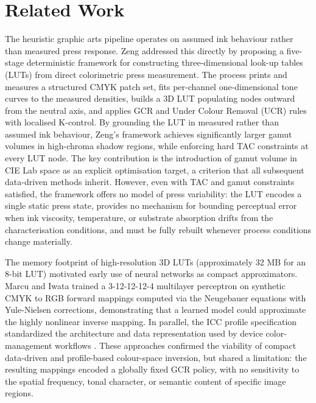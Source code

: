 \documentclass[11pt]{article}
\begin{document}
\section{Related Work}

The heuristic graphic arts pipeline operates on assumed ink behaviour rather than measured press response. Zeng \cite{zeng} addressed this directly by proposing a five-stage deterministic framework for constructing three-dimensional look-up tables (LUTs) from direct colorimetric press measurement. The process prints and measures a structured CMYK patch set, fits per-channel one-dimensional tone curves to the measured densities, builds a 3D LUT populating nodes outward from the neutral axis, and applies GCR and Under Colour Removal (UCR) rules with localised K-control. By grounding the LUT in measured rather than assumed ink behaviour, Zeng's framework achieves significantly larger gamut volumes in high-chroma shadow regions, while enforcing hard TAC constraints at every LUT node. The key contribution is the introduction of gamut volume in CIE Lab space as an explicit optimisation target, a criterion that all subsequent data-driven methods inherit. However, even with TAC and gamut constraints satisfied, the framework offers no model of press variability: the LUT encodes a single static press state, provides no mechanism for bounding perceptual error when ink viscosity, temperature, or substrate absorption drifts from the characterisation conditions, and must be fully rebuilt whenever process conditions change materially.

The memory footprint of high-resolution 3D LUTs (approximately 32 MB for an 8-bit LUT) motivated early use of neural networks as compact approximators. Marcu and Iwata \cite{marcu} trained a 3-12-12-12-4 multilayer perceptron on synthetic CMYK to RGB forward mappings computed via the Neugebauer equations with Yule-Nielsen corrections, demonstrating that a learned model could approximate the highly nonlinear inverse mapping. In parallel, the ICC profile specification standardized the architecture and data representation used by device color-management workflows \cite{icc}. These approaches confirmed the viability of compact data-driven and profile-based colour-space inversion, but shared a limitation: the resulting mappings encoded a globally fixed GCR policy, with no sensitivity to the spatial frequency, tonal character, or semantic content of specific image regions.
\end{document}
